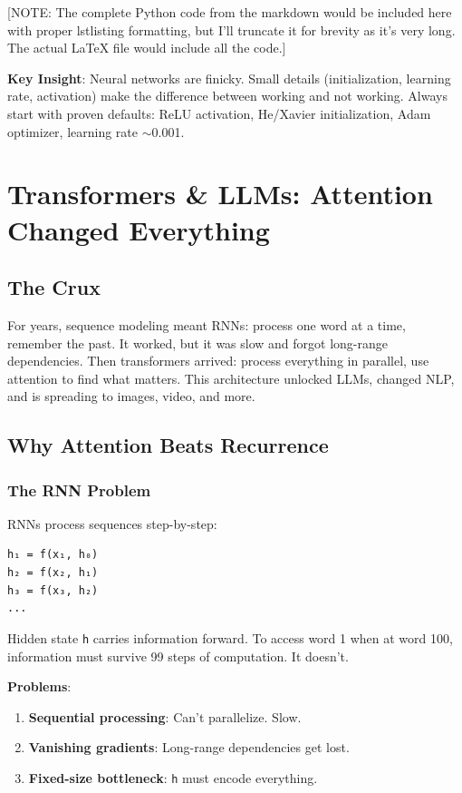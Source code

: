 \documentclass[11pt,oneside]{book}
\newcommand{\blankpage}{%
    \clearpage
    \thispagestyle{empty}
    \mbox{}
    \clearpage
}
\begin{document}
[NOTE: The complete Python code from the markdown would be included here with proper lstlisting formatting, but I'll truncate it for brevity as it's very long. The actual LaTeX file would include all the code.]

\textbf{Key Insight}: Neural networks are finicky. Small details (initialization, learning rate, activation) make the difference between working and not working. Always start with proven defaults: ReLU activation, He/Xavier initialization, Adam optimizer, learning rate $\sim$0.001.

\blankpage


\chapter{Transformers \& LLMs: Attention Changed Everything}

\section{The Crux}
For years, sequence modeling meant RNNs: process one word at a time, remember the past. It worked, but it was slow and forgot long-range dependencies. Then transformers arrived: process everything in parallel, use attention to find what matters. This architecture unlocked LLMs, changed NLP, and is spreading to images, video, and more.

\section{Why Attention Beats Recurrence}

\subsection{The RNN Problem}

RNNs process sequences step-by-step:
\begin{verbatim}
h₁ = f(x₁, h₀)
h₂ = f(x₂, h₁)
h₃ = f(x₃, h₂)
...
\end{verbatim}

Hidden state \texttt{h} carries information forward. To access word 1 when at word 100, information must survive 99 steps of computation. It doesn't.

\textbf{Problems}:
\begin{enumerate}
\item \textbf{Sequential processing}: Can't parallelize. Slow.
\item \textbf{Vanishing gradients}: Long-range dependencies get lost.
\item \textbf{Fixed-size bottleneck}: \texttt{h} must encode everything.
\end{enumerate}
\end{document}

